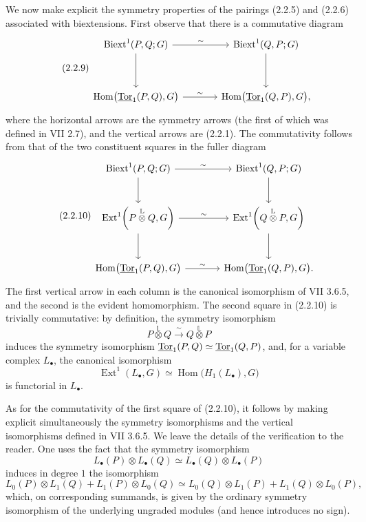 We now make explicit the symmetry properties of the pairings (2.2.5)
and (2.2.6) associated with biextensions.  First observe that there is
a commutative diagram
\begin{equation}\tag{2.2.9}
\begin{tikzcd}[column sep=large,row sep=huge]
 \mathrm{Biext}^1(P,Q;G)
   \arrow[r,"\sim"]
   \arrow[d]&
 \mathrm{Biext}^1(Q,P;G)
   \arrow[d]\\
 \operatorname{Hom}\bigl(\uTor_1(P,Q),G\bigr)
   \arrow[r,"\sim"]&
 \operatorname{Hom}\bigl(\uTor_1(Q,P),G\bigr),
\end{tikzcd}
\end{equation}
where the horizontal arrows are the symmetry arrows (the first of
which was defined in VII 2.7), and the vertical arrows are (2.2.1).
The commutativity follows from that of the two constituent squares in
the fuller diagram
\begin{equation}\tag{2.2.10}
\begin{tikzcd}[column sep=large,row sep=large]
 \mathrm{Biext}^1(P,Q;G)
   \arrow[r,"\sim"]
   \arrow[d]&
 \mathrm{Biext}^1(Q,P;G)
   \arrow[d]\\
 \operatorname{Ext}^1\!\left(
   P\mathbin{\overset{\mathbb L}{\otimes}}Q,G
 \right)
   \arrow[r,"\sim"]
   \arrow[d]&
 \operatorname{Ext}^1\!\left(
   Q\mathbin{\overset{\mathbb L}{\otimes}}P,G
 \right)
   \arrow[d]\\
 \operatorname{Hom}\bigl(\uTor_1(P,Q),G\bigr)
   \arrow[r,"\sim"]&
 \operatorname{Hom}\bigl(\uTor_1(Q,P),G\bigr).
\end{tikzcd}
\end{equation}
The first vertical arrow in each column is the canonical isomorphism
of VII 3.6.5, and the second is the evident homomorphism.  The second
square in (2.2.10) is trivially commutative: by definition, the
symmetry isomorphism
\[
 P\mathbin{\overset{\mathbb L}{\otimes}}Q
 \xrightarrow{\ \sim\ }
 Q\mathbin{\overset{\mathbb L}{\otimes}}P
\]
induces the symmetry isomorphism
$\uTor_1(P,Q)\simeq\uTor_1(Q,P)$, and, for a variable complex
$L_\bullet$, the canonical isomorphism
\[
 \operatorname{Ext}^1(L_\bullet,G)
 \simeq
 \operatorname{Hom}\bigl(H_1(L_\bullet),G\bigr)
\]
is functorial in $L_\bullet$.

As for the commutativity of the first square of (2.2.10), it follows
by making explicit simultaneously the symmetry isomorphisms and the
vertical isomorphisms defined in VII 3.6.5.  We leave the details of
the verification to the reader.  One uses the fact that the symmetry
isomorphism
\[
 L_\bullet(P)\otimes L_\bullet(Q)
 \simeq
 L_\bullet(Q)\otimes L_\bullet(P)
\]
induces in degree $1$ the isomorphism
\[
 L_0(P)\otimes L_1(Q)+L_1(P)\otimes L_0(Q)
 \simeq
 L_0(Q)\otimes L_1(P)+L_1(Q)\otimes L_0(P),
\]
which, on corresponding summands, is given by the ordinary symmetry
isomorphism of the underlying ungraded modules (and hence introduces
no sign).

